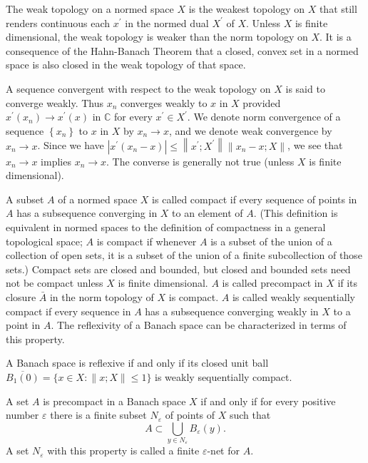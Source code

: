\begin{para}
  The weak topology on a normed space $X$ is the weakest topology on $X$ that still renders continuous each $x^{\prime}$ in the normed dual $X^{\prime}$ of $X$. Unless $X$ is finite dimensional, the weak topology is weaker than the norm topology on $X$. It is a consequence of the Hahn-Banach Theorem that a closed, convex set in a normed space is also closed in the weak topology of that space.

  A sequence convergent with respect to the weak topology on $X$ is said to converge weakly. Thus $x_n$ converges weakly to $x$ in $X$ provided $x^{\prime}\left(x_n\right) \rightarrow x^{\prime}(x)$ in $\mathbb{C}$ for every $x^{\prime} \in X^{\prime}$. We denote norm convergence of a sequence $\left\{x_n\right\}$ to $x$ in $X$ by $x_n \rightarrow x$, and we denote weak convergence by $x_n \rightarrow x$. Since we have $\left|x^{\prime}\left(x_n-x\right)\right| \leq\left\|x^{\prime} ; X^{\prime}\right\|\left\|x_n-x ; X\right\|$, we see that $x_n \rightarrow x$ implies $x_n \rightarrow x$. The converse is generally not true (unless $X$ is finite dimensional).
\end{para}


\begin{para}
  A subset $A$ of a normed space $X$ is called compact if every sequence of points in $A$ has a subsequence converging in $X$ to an element of $A$. (This definition is equivalent in normed spaces to the definition of compactness in a general topological space; $A$ is compact if whenever $A$ is a subset of the union of a collection of open sets, it is a subset of the union of a finite subcollection of those sets.) Compact sets are closed and bounded, but closed and bounded sets need not be compact unless $X$ is finite dimensional. $A$ is called precompact in $X$ if its closure $\bar{A}$ in the norm topology of $X$ is compact. $A$ is called weakly sequentially compact if every sequence in $A$ has a subsequence converging weakly in $X$ to a point in $A$. The reflexivity of a Banach space can be characterized in terms of this property.
\end{para}


\begin{theorem}
  A Banach space is reflexive if and only if its closed unit ball $\overline{B_1(0)}=\{x \in X:\|x ; X\| \leq 1\}$ is weakly sequentially compact.
\end{theorem}


\begin{theorem}
  A set $A$ is precompact in a Banach space $X$ if and only if for every positive 
  number $\varepsilon$ there is a finite subset $N_\varepsilon$ of points of $X$ such that
  \[
  A \subset \bigcup_{y \in N_\varepsilon} B_\varepsilon(y) .
  \]
  A set $N_\varepsilon$ with this property is called a finite $\varepsilon$-net for $A$.
\end{theorem}


